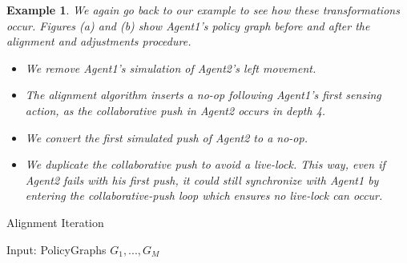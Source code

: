 \documentclass[letterpaper]{article} %
\newtheorem{example}{Example}
\begin{document}
\begin{example}
We again go back to our example to see how these transformations occur. Figures (a) and (b) show \emph{Agent1}'s policy graph before and after the alignment and adjustments procedure.

\begin{figure}
    \centering
      \hfill
\end{figure}

\begin{itemize}
    \item We remove \emph{Agent1}'s simulation of \emph{Agent2}'s left movement.
    \item The alignment algorithm inserts a {\em no-op} following \emph{Agent1}'s first sensing action, as the collaborative push in \emph{Agent2} occurs in depth 4.
    \item We convert the first simulated push of \emph{Agent2} to a {\em no-op}.
    \item We duplicate the collaborative push to avoid a live-lock. This way, even if \emph{Agent2} fails with his first push, it could still synchronize with \emph{Agent1} by entering the collaborative-push loop which ensures no live-lock can occur.
\end{itemize}
\end{example}


\begin{algorithm}
\caption{Alignment Iteration}
\begin{algorithmic}[tbph]
\State Input: PolicyGraphs $G_1, ..., G_M$
	\EndFor
	\EndIf
	\EndWhile
\EndFor
{}
\end{algorithmic}
\end{algorithm}
\end{document}
